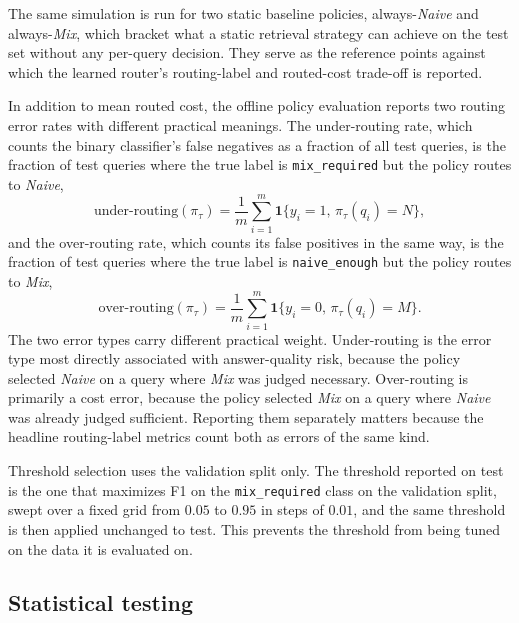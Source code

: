 \documentclass[english, bibtex]{kththesis}               %
\numberwithin{listing}{chapter}
\begin{document}
The same simulation is run for two static baseline policies, always-\emph{Naive} and always-\emph{Mix}, which bracket what a static retrieval strategy can achieve on the test set without any per-query decision. They serve as the reference points against which the learned router's routing-label and routed-cost trade-off is reported.

In addition to mean routed cost, the offline policy evaluation reports two routing error rates with different practical meanings. The under-routing rate, which counts the binary classifier's false negatives as a fraction of all test queries, is the fraction of test queries where the true label is \texttt{mix\_required} but the policy routes to \emph{Naive},
\begin{equation}
\label{eq:underRouting}
\mathrm{under\text{-}routing}(\pi_\tau)
=
\frac{1}{m}
\sum_{i=1}^{m}
\mathbf{1}\{y_i = 1,\, \pi_\tau(q_i) = N\},
\end{equation}
and the over-routing rate, which counts its false positives in the same way, is the fraction of test queries where the true label is \texttt{naive\_enough} but the policy routes to \emph{Mix},
\begin{equation}
\label{eq:overRouting}
\mathrm{over\text{-}routing}(\pi_\tau)
=
\frac{1}{m}
\sum_{i=1}^{m}
\mathbf{1}\{y_i = 0,\, \pi_\tau(q_i) = M\}.
\end{equation}
The two error types carry different practical weight. Under-routing is the error type most directly associated with answer-quality risk, because the policy selected \emph{Naive} on a query where \emph{Mix} was judged necessary. Over-routing is primarily a cost error, because the policy selected \emph{Mix} on a query where \emph{Naive} was already judged sufficient. Reporting them separately matters because the headline routing-label metrics count both as errors of the same kind.

Threshold selection uses the validation split only. The threshold reported on test is the one that maximizes F1 on the \texttt{mix\_required} class on the validation split, swept over a fixed grid from $0.05$ to $0.95$ in steps of $0.01$, and the same threshold is then applied unchanged to test. This prevents the threshold from being tuned on the data it is evaluated on.

\subsection{Statistical testing}
\label{sec:methodStats}
\end{document}
